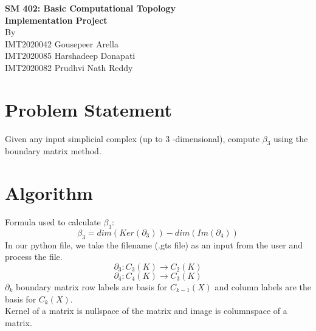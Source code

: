 \documentclass[11pt]{article}
\begin{document}
\begin{titlepage}
\begin{center}
\vspace*{0.5cm}
\Large{\textbf{SM 402: Basic Computational Topology}}\\
\Large{\textbf{Implementation Project}}\\
\vfill
\vfill
By \\ 
IMT2020042 Gousepeer Arella \\
IMT2020085 Harshadeep Donapati \\
IMT2020082 Prudhvi Nath Reddy \\
\end{center}
\end{titlepage}

\tableofcontents
\thispagestyle{empty}
\clearpage
\setcounter{page}{1}

\section{Problem Statement}
Given any input simplicial complex (up to 3 -dimensional), compute $\beta_3$ 
using the boundary matrix method.

\section{Algorithm}
Formula used to calculate $\beta_3$: \\
\begin{equation}
    \beta_3 = dim(Ker(\partial_3)) - dim(Im(\partial_4))
\end{equation}
In our python file, we take the filename (.gts file) as an input from the user and process the file.
\begin{equation*}
    \partial_3 : C_{3}(K) \to C_{2}(K) 
\end{equation*}
\begin{equation*}
    \partial_4 : C_{4}(K) \to C_{3}(K)
\end{equation*}
$\partial_k$ boundary matrix row labels are basis for $C_{k-1}(X)$ and column labels are the basis for $C_{k}(X)$.  \\
Kernel of a matrix is nullspace of the matrix and image is columnspace of a matrix.
\end{document}
